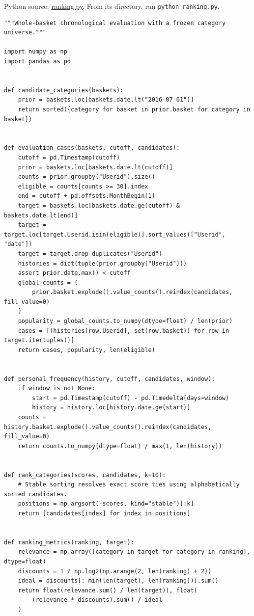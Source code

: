 \FloatBarrier
{}
Python source:
\href{../03_Data_and_Code/mHealth/recurring_examples/ranking.py}{ranking.py}.
From its directory, run \texttt{python\ ranking.py}.

\begin{Verbatim}[breaklines,breakanywhere,fontsize=\small]
"""Whole-basket chronological evaluation with a frozen category universe."""

import numpy as np
import pandas as pd


def candidate_categories(baskets):
    prior = baskets.loc[baskets.date.lt("2016-07-01")]
    return sorted({category for basket in prior.basket for category in basket})


def evaluation_cases(baskets, cutoff, candidates):
    cutoff = pd.Timestamp(cutoff)
    prior = baskets.loc[baskets.date.lt(cutoff)]
    counts = prior.groupby("Userid").size()
    eligible = counts[counts >= 30].index
    end = cutoff + pd.offsets.MonthBegin(1)
    target = baskets.loc[baskets.date.ge(cutoff) & baskets.date.lt(end)]
    target = target.loc[target.Userid.isin(eligible)].sort_values(["Userid", "date"])
    target = target.drop_duplicates("Userid")
    histories = dict(tuple(prior.groupby("Userid")))
    assert prior.date.max() < cutoff
    global_counts = (
        prior.basket.explode().value_counts().reindex(candidates, fill_value=0)
    )
    popularity = global_counts.to_numpy(dtype=float) / len(prior)
    cases = [(histories[row.Userid], set(row.basket)) for row in target.itertuples()]
    return cases, popularity, len(eligible)


def personal_frequency(history, cutoff, candidates, window):
    if window is not None:
        start = pd.Timestamp(cutoff) - pd.Timedelta(days=window)
        history = history.loc[history.date.ge(start)]
    counts = history.basket.explode().value_counts().reindex(candidates, fill_value=0)
    return counts.to_numpy(dtype=float) / max(1, len(history))


def rank_categories(scores, candidates, k=10):
    # Stable sorting resolves exact score ties using alphabetically sorted candidates.
    positions = np.argsort(-scores, kind="stable")[:k]
    return [candidates[index] for index in positions]


def ranking_metrics(ranking, target):
    relevance = np.array([category in target for category in ranking], dtype=float)
    discounts = 1 / np.log2(np.arange(2, len(ranking) + 2))
    ideal = discounts[: min(len(target), len(ranking))].sum()
    return float(relevance.sum() / len(target)), float(
        (relevance * discounts).sum() / ideal
    )



\end{Verbatim}
